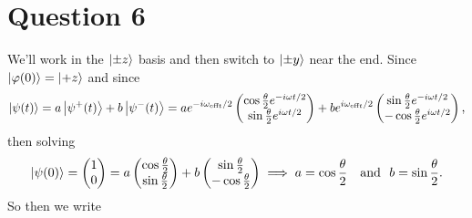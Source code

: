 \documentclass[12pt]{article}
\theoremstyle{definition}
\theoremstyle{definition}
\theoremstyle{definition}
\theoremstyle{definition}
\theoremstyle{definition}
\theoremstyle{example}
\theoremstyle{note}
\theoremstyle{remark}
\theoremstyle{example}
\begin{document}
			\section*{Question 6}
				We'll work in the $\ket{\pm z}$ basis and then switch to $\ket{\pm y}$ near the end. Since $\ket{\varphi(0)} = \ket{+z}$ and since 
				$$ \ket{\psi(t)} = a \ket{\psi^{+}(t)} + b\ket{\psi^{-}(t)} = a e^{-i \omega_{\text{eff} t} /2}  \begin{pmatrix}
					\cos \frac{\theta}{2} e^{-i \omega t /2} \\ \sin \frac{\theta}{2} e^{i \omega t / 2} 
				\end{pmatrix} + be^{i \omega_{\text{eff} t} /2}  \begin{pmatrix}
				\sin \frac{\theta}{2} e^{-i \omega t /2} \\ -\cos \frac{\theta}{2} e^{i \omega t / 2} 
				\end{pmatrix}, $$
				then solving 
				$$\ket{\psi(0)} = \begin{pmatrix}
				 1 \\ 0
				\end{pmatrix} = a \begin{pmatrix}
					\cos \frac{\theta}{2} \\ \sin \frac{\theta}{2} 
				\end{pmatrix} + b\begin{pmatrix}
					\sin \frac{\theta}{2} \\ -\cos \frac{\theta}{2} 
				\end{pmatrix}  \implies a = \cos \frac{\theta}{2} \quad \text{and } \ b = \sin \frac{\theta}{2}.$$
				So then we write
\end{document}
